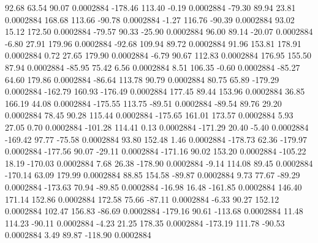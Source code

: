        92.68       63.54       90.07     0.0002884
     -178.46      113.40       -0.19     0.0002884
      -79.30       89.94       23.81     0.0002884
      168.68      113.66      -90.78     0.0002884
       -1.27      116.76      -90.39     0.0002884
       93.02       15.12      172.50     0.0002884
      -79.57       90.33      -25.90     0.0002884
       96.00       89.14      -20.07     0.0002884
       -6.80       27.91      179.96     0.0002884
      -92.68      109.94       89.72     0.0002884
       91.96      153.81      178.91     0.0002884
        0.72       27.65      179.90     0.0002884
       -6.79       90.67      112.83     0.0002884
      176.95      155.50       87.94     0.0002884
      -85.95       75.42        6.56     0.0002884
        8.51      106.35       -0.60     0.0002884
      -85.27       64.60      179.86     0.0002884
      -86.64      113.78       90.79     0.0002884
       80.75       65.89     -179.29     0.0002884
     -162.79      160.93     -176.49     0.0002884
      177.45       89.44      153.96     0.0002884
       36.85      166.19       44.08     0.0002884
     -175.55      113.75      -89.51     0.0002884
      -89.54       89.76       29.20     0.0002884
       78.45       90.28      115.44     0.0002884
     -175.65      161.01      173.57     0.0002884
        5.93       27.05        0.70     0.0002884
     -101.28      114.41        0.13     0.0002884
     -171.29       20.40       -5.40     0.0002884
     -169.42       97.77      -75.58     0.0002884
       93.80      152.48        1.46     0.0002884
     -178.73       62.36     -179.97     0.0002884
     -177.56       90.07      -29.11     0.0002884
     -171.16       90.02      153.20     0.0002884
     -105.22       18.19     -170.03     0.0002884
        7.68       26.38     -178.90     0.0002884
       -9.14      114.08       89.45     0.0002884
     -170.14       63.09      179.99     0.0002884
       88.85      154.58      -89.87     0.0002884
        9.73       77.67      -89.29     0.0002884
     -173.63       70.94      -89.85     0.0002884
      -16.98       16.48     -161.85     0.0002884
      146.40      171.14      152.86     0.0002884
      172.58       75.66      -87.11     0.0002884
       -6.33       90.27      152.12     0.0002884
      102.47      156.83      -86.69     0.0002884
     -179.16       90.61     -113.68     0.0002884
       11.48      114.23      -90.11     0.0002884
       -4.23       21.25      178.35     0.0002884
     -173.19      111.78      -90.53     0.0002884
        3.49       89.87     -118.90     0.0002884
